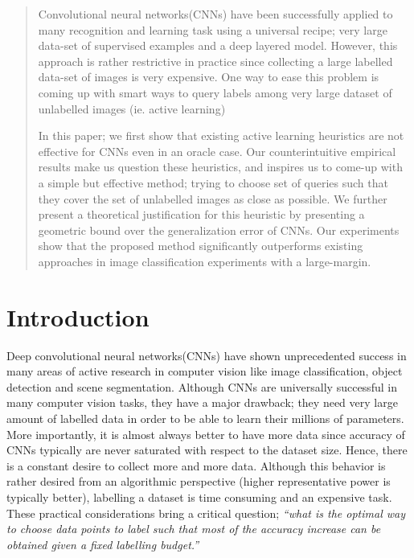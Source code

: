 \documentclass{article}
\begin{document}
\begin{abstract} 
Convolutional neural networks(CNNs) have been successfully applied to many recognition and learning task using a universal recipe; very large data-set of supervised examples and a deep layered model. However, this approach is rather restrictive in practice since collecting a large labelled data-set of images is very expensive. One way to ease this problem is coming up with smart ways to query labels among very large dataset of unlabelled images (ie. active learning)%

In this paper; we first show that existing active learning heuristics are not effective for CNNs even in an oracle case. Our counterintuitive empirical results make us question these heuristics, and inspires us to come-up with a simple but effective method; trying to choose set of queries such that they cover the set of unlabelled images as close as possible. We further present a theoretical justification for this heuristic by presenting a geometric bound over the generalization error of CNNs. Our experiments show that the proposed method significantly outperforms existing approaches in image classification experiments with a large-margin.
\end{abstract} 

\section{Introduction}
Deep convolutional neural networks(CNNs) have shown unprecedented success in many areas of active research in computer vision like image classification, object detection and scene segmentation. Although CNNs are universally successful in many computer vision tasks, they have a major drawback; they need very large amount of labelled data in order to be able to learn their millions of parameters. More importantly, it is almost always better to have more data since accuracy of CNNs typically are never saturated with respect to the dataset size. Hence, there is a constant desire to collect more and more data. Although this behavior is rather desired from an algorithmic perspective (higher representative power is typically better), labelling a dataset is time consuming and an expensive task. These practical considerations bring a critical question; \emph{``what is the optimal way to choose data points to label such that most of the accuracy increase can be obtained given a fixed labelling budget.''}  
\end{document}
